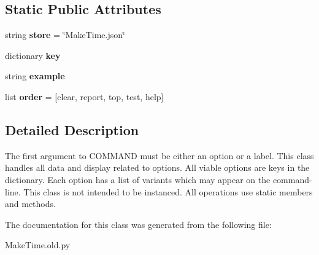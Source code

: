 \subsection*{Static Public Attributes}
\begin{DoxyCompactItemize}
\item 
\hypertarget{classc_1_1_make_time_1_1_option_aeb22c8cafa69f0e4599c896ce54b4212}{}string {\bfseries store} = \char`\"{}Make\+Time.\+json\char`\"{}\label{classc_1_1_make_time_1_1_option_aeb22c8cafa69f0e4599c896ce54b4212}

\item 
\hypertarget{classc_1_1_make_time_1_1_option_a571699b044ea236a203ff2991b512684}{}dictionary {\bfseries key}\label{classc_1_1_make_time_1_1_option_a571699b044ea236a203ff2991b512684}

\item 
\hypertarget{classc_1_1_make_time_1_1_option_ac5e1c663e061094096622f8471736732}{}string {\bfseries example}\label{classc_1_1_make_time_1_1_option_ac5e1c663e061094096622f8471736732}

\item 
\hypertarget{classc_1_1_make_time_1_1_option_a25107ccb7b35e7df1a5e012c7ddf41de}{}list {\bfseries order} = \mbox{[}\textquotesingle{}clear\textquotesingle{}, \textquotesingle{}report\textquotesingle{}, \textquotesingle{}top\textquotesingle{}, \textquotesingle{}test\textquotesingle{}, \textquotesingle{}help\textquotesingle{}\mbox{]}\label{classc_1_1_make_time_1_1_option_a25107ccb7b35e7df1a5e012c7ddf41de}

\end{DoxyCompactItemize}


\subsection{Detailed Description}
\begin{DoxyVerb}The first argument to {COMMAND} must be either an option or a label.
This class handles all data and display related to options.
All viable options are keys in the dictionary.
Each option has a list of variants which may appear on the command-line.
This class is not intended to be instanced.
All operations use static members and methods.
\end{DoxyVerb}
 

The documentation for this class was generated from the following file\+:\begin{DoxyCompactItemize}
\item 
Make\+Time.\+old.\+py\end{DoxyCompactItemize}
